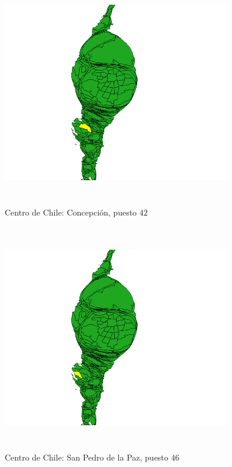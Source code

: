 \documentclass[20pt]{report}
\begin{document}
\begin{itemize}
\begin{figure}[H]
\begin{center}
\includegraphics[width=10cm, height=10cm]{concepcion42.png}
\vspace{-0.5cm} %
\caption{Centro de Chile: Concepci\'on, puesto $42$}
\label{Label para referencia}
\end{center}
\end{figure}





\begin{figure}[H]
\begin{center}
\includegraphics[width=10cm, height=10cm]{sanpedro.png}
\vspace{-0.5cm} %
\caption{Centro de Chile: San Pedro de la Paz, puesto $46$}
\label{Label para referencia}
\end{center}
\end{figure}


\end{itemize}
\end{document}
